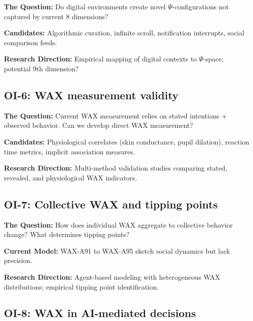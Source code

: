 \textbf{The Question:} Do digital environments create novel $\Psi$-configurations not captured by current 8 dimensions?

\textbf{Candidates:} Algorithmic curation, infinite scroll, notification interrupts, social comparison feeds.

\textbf{Research Direction:} Empirical mapping of digital contexts to $\Psi$-space; potential 9th dimension?

\subsection{OI-6: WAX measurement validity}

\textbf{The Question:} Current WAX measurement relies on stated intentions + observed behavior. Can we develop direct WAX measurement?

\textbf{Candidates:} Physiological correlates (skin conductance, pupil dilation), reaction time metrics, implicit association measures.

\textbf{Research Direction:} Multi-method validation studies comparing stated, revealed, and physiological WAX indicators.

\subsection{OI-7: Collective WAX and tipping points}

\textbf{The Question:} How does individual WAX aggregate to collective behavior change? What determines tipping points?

\textbf{Current Model:} WAX-A91 to WAX-A95 sketch social dynamics but lack precision.

\textbf{Research Direction:} Agent-based modeling with heterogeneous WAX distributions; empirical tipping point identification.

\subsection{OI-8: WAX in AI-mediated decisions}

